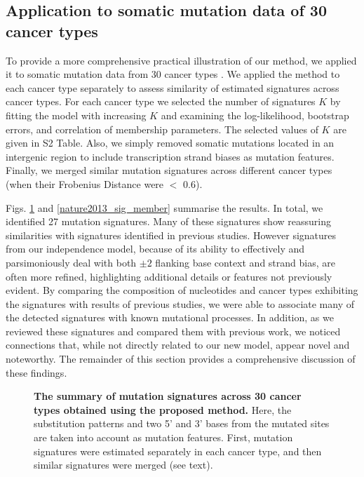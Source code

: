 \documentclass[10pt,letterpaper]{article}
\begin{document}
\subsection*{Application to somatic mutation data of 30 cancer types}
 
To provide a more comprehensive practical illustration of
our method, we applied it to somatic mutation data from 30 cancer types \cite{pmid23945592}.
We applied the method to each cancer type separately to assess similarity of estimated signatures across cancer types.
For each cancer type we selected the number of signatures $K$ by fitting the model with increasing $K$ and examining the log-likelihood, bootstrap errors, and correlation of membership parameters.
The selected values of $K$ are given in S2 Table.
Also, we simply removed somatic mutations located in an intergenic region to include transcription strand biases as mutation features.
Finally, we merged similar mutation signatures across different cancer types 
(when their Frobenius Distance were $<$ $0.6$). 



Figs. \ref{nature2013_sig_summary} and \ref{nature2013_sig_member} summarise the results.
In total, we identified 27 mutation signatures.
Many of these signatures show reassuring similarities with
signatures identified in previous studies. However
signatures from our independence model, because of its ability to effectively
and parsimoniously deal with both $\pm2$ flanking
base context and strand bias, are often more refined, highlighting additional details or features not previously evident. By comparing the composition of nucleotides and cancer types exhibiting the signatures with results of previous studies, we were able to associate many of the detected signatures with known mutational processes.
In addition, as we reviewed these signatures
and compared them with previous work, we noticed connections
that, while not directly related to our new model, appear
novel and noteworthy. The remainder of this section
provides a comprehensive discussion of these findings.

\begin{figure}[h]
\centering
\caption{{\bf The summary of mutation signatures across 30 cancer types \cite{pmid23945592} obtained using the proposed method.}
Here, the substitution patterns and two 5' and 3' bases from the mutated sites are taken into account as mutation features.
First, mutation signatures were estimated separately in each cancer type, and then similar signatures were merged (see text).
}
\label{nature2013_sig_summary}
\end{figure}
\end{document}
